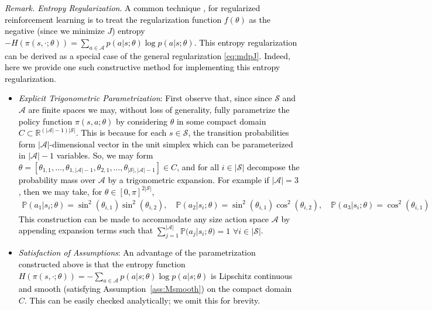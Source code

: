 \documentclass[journal,onecolumn]{IEEEtran}
\newcommand{\rew}{J}
\newcommand{\reals}{\mathbb{R}}
\newcommand{\PR}{\mathbb{P}}
\newcommand{\CS}{\mathcal{S}}
\newcommand{\CA}{\mathcal{A}}
\begin{document}
\textcolor{black}{\textit{Remark. Entropy Regularization}. A common technique \cite{liu2019policy}, \cite{neu2017unified} for regularized reinforcement learning is to treat the regularization function $f(\theta)$ as the negative (since we minimize $\rew$) entropy $-H(\pi(s,\cdot;\theta)) = \sum_{a\in\CA}p(a|s;\theta)\log p(a|s;\theta)$. This entropy regularization can be derived as a special case of the general regularization \eqref{eq:mdpJ}. Indeed, here we provide one such constructive method for implementing this entropy regularization.
\begin{itemize}
    \item[-] \textit{Explicit Trigonometric Parametrization}: First observe that, since since $\CS$ and $\CA$ are finite spaces we may, without loss of generality, fully parametrize the policy function $\pi(s,a;\theta)$ by considering $\theta$ in some compact domain $C \subset \reals^{(|\CA|-1)|\CS|}$. This is because for each $s\in\CS$, the transition probabilities form $|\CA|$-dimensional vector in the unit simplex which can be parameterized in $|\CA|-1$ variables. So, we may form $\theta = [\theta_{1,1},\dots,\theta_{1,|\CA|-1},\theta_{2,1},\dots,\theta_{|\CS|,|\CA|-1}] \in C$, and for all $i\in|\CS|$ decompose the probability mass over $\CA$ by a trigonometric expansion. For example if $|\CA| = 3$, then we may take, for $\theta \in [0,\pi]^{2|\CS|}$,
    \begin{align*}
        \PR(a_1 | s_i; \theta) = \sin^2(\theta_{i,1})\sin^2(\theta_{i,2}),\quad
        \PR(a_2 | s_i; \theta) = \sin^2(\theta_{i,1})\cos^2(\theta_{i,2}),\quad
        \PR(a_3 | s_i; \theta) = \cos^2(\theta_{i,1})
    \end{align*}
    This construction can be made to accommodate any size action space $\CA$ by appending expansion terms such that $\sum_{j=1}^{|\CA|}\PR(a_j | s_i; \theta) = 1\,\,\forall i\in|\CS|$.
    \item[-] \textit{Satisfaction of Assumptions}: An advantage of the parametrization constructed above is that the entropy function $H(\pi(s,\cdot;\theta)) = -\sum_{a\in\CA}p(a|s;\theta)\log p(a|s;\theta)$ is Lipschitz continuous and smooth (satisfying Assumption~\ref{ass:Msmooth}) on the compact domain $C$. This can be easily checked analytically; we omit this for brevity. 
\end{itemize}
}
\end{document}
